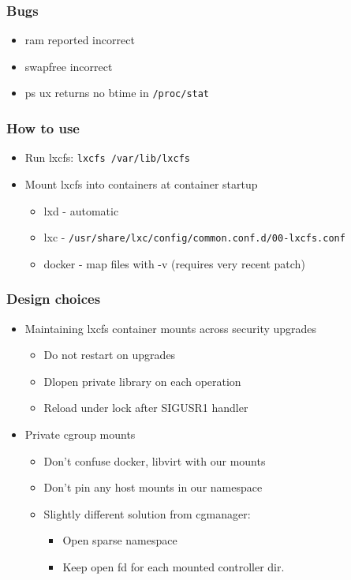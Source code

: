\documentclass{beamer}
\begin{document}
\begin{frame}
\frametitle{Bugs}
	\begin{itemize}
	\item ram reported incorrect
	\item swapfree incorrect
	\item ps ux returns no btime in {\tt /proc/stat}
	\end{itemize}
\end{frame}

\lstset{language=bash}

\begin{frame}
\frametitle{How to use}
\begin{itemize}
\item Run lxcfs: {\tt lxcfs /var/lib/lxcfs}

\item Mount lxcfs into containers at container startup
	\begin{itemize}
	\item lxd - automatic
	\item lxc - {\tt /usr/share/lxc/config/common.conf.d/00-lxcfs.conf}
	\item docker - map files with -v (requires very recent patch)
	\end{itemize}
\end{itemize}

\newpage

{\tiny

}
\end{frame}

\begin{frame}
\frametitle{Design choices}
	\begin{itemize}
	\item Maintaining lxcfs container mounts across security upgrades
		\begin{itemize}
		\item Do not restart on upgrades
		\item Dlopen private library on each operation
		\item Reload under lock after SIGUSR1 handler
		\end{itemize}
	\item Private cgroup mounts
		\begin{itemize}
		\item Don't confuse docker, libvirt with our mounts
		\item Don't pin any host mounts in our namespace
		\item Slightly different solution from cgmanager:
			\begin{itemize}
			\item Open sparse namespace
			\item Keep open fd for each mounted controller dir.
			\end{itemize}
		\end{itemize}
	\end{itemize}
\end{frame}
\end{document}
